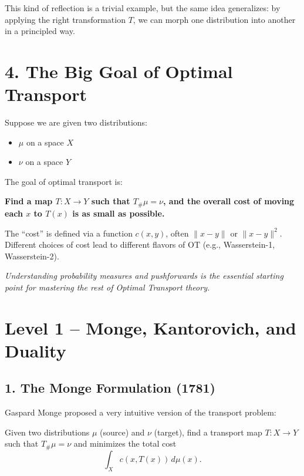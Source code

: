 \documentclass[11pt]{article}
\begin{document}
This kind of reflection is a trivial example, but the same idea generalizes: by applying the right transformation $T$, we can morph one distribution into another in a principled way.

\section*{4. The Big Goal of Optimal Transport}

Suppose we are given two distributions:
\begin{itemize}
    \item $\mu$ on a space $X$
    \item $\nu$ on a space $Y$
\end{itemize}

The goal of optimal transport is:

\begin{highlight}
\textbf{Find a map $T : X \to Y$ such that $T_\#\mu = \nu$, and the overall cost of moving each $x$ to $T(x)$ is as small as possible.}
\end{highlight}

The ``cost'' is defined via a function $c(x, y)$, often $\|x - y\|$ or $\|x - y\|^2$.
Different choices of cost lead to different flavors of OT (e.g., Wasserstein-1, Wasserstein-2).

\vspace{1em}
\begin{center}
\textit{Understanding probability measures and pushforwards is the essential starting point for mastering the rest of Optimal Transport theory.}
\end{center}


\newpage
{}
\section*{Level 1 – Monge, Kantorovich, and Duality}

\subsection*{1. The Monge Formulation (1781)}

Gaspard Monge proposed a very intuitive version of the transport problem:

\begin{highlight}
Given two distributions $\mu$ (source) and $\nu$ (target), find a transport map $T : X \to Y$ such that $T_\#\mu = \nu$ and minimizes the total cost
\[
\int_X c(x, T(x))\,d\mu(x).
\]
\end{highlight}
\end{document}
